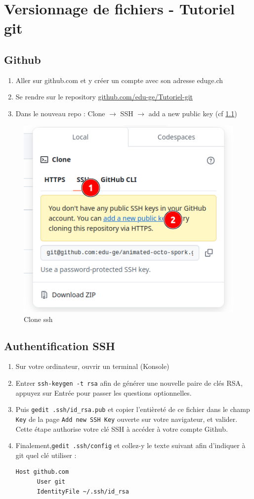 \documentclass[11pt, a4paper]{book}
\begin{document}
\setcounter{chapter}{0}
\chapter{Versionnage de fichiers - Tutoriel git}

\section{Github}
\begin{enumerate}
    \item Aller sur github.com et y créer un compte avec son adresse eduge.ch
    \item Se rendre sur le repository \href{https://github.com/edu-ge/Tutoriel-git}{github.com/edu-ge/Tutoriel-git}
    \item Dans le nouveau repo : Clone $\rightarrow$ SSH $\rightarrow$ add a new public key (cf \ref{ssh})
\end{enumerate}

\begin{figure}[h!]
\centering
    \includegraphics[width=0.4\linewidth]{ssh.png}
    \caption{Clone ssh}
    \label{ssh}
\end{figure}

\section{Authentification SSH}

\begin{enumerate}
    \item Sur votre ordinateur, ouvrir un terminal (Konsole)
    \item Entrer \texttt{ssh-keygen -t rsa} afin de générer une nouvelle paire de clés RSA, appuyez sur Entrée pour passer les questions optionnelles.
    
    \item Puis \texttt{gedit .ssh/id\_rsa.pub} et copier l'entièreté de ce fichier dans le champ \texttt{Key} de la page \texttt{Add new SSH Key} ouverte sur votre navigateur, et valider. Cette étape authorise votre clé SSH à accéder à votre compte Github.
    \item Finalement,\texttt{gedit .ssh/config} et collez-y le texte suivant afin d'indiquer à git quel clé utiliser : \begin{lstlisting}[numbers=none]
  Host github.com
      User git
      IdentityFile ~/.ssh/id_rsa
\end{lstlisting}
\end{enumerate}
\end{document}
